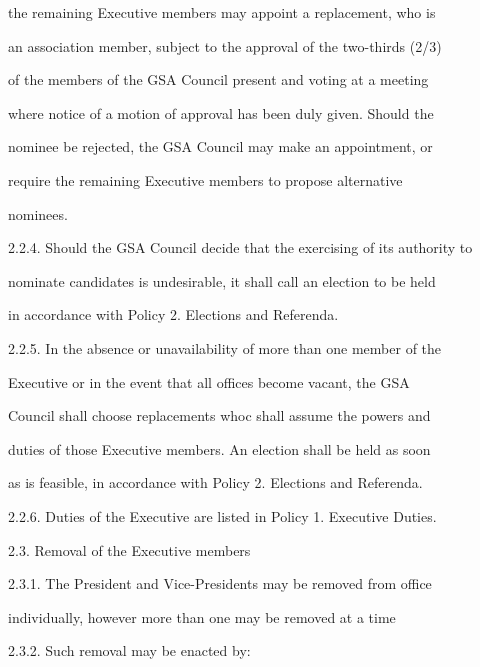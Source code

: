         the remaining Executive members may appoint a replacement, who is  

        an association member, subject to the approval of the two-thirds (2/3)  

        of the members of the GSA Council present and voting at a meeting  

        where notice of a motion of approval has been duly given. Should the  

        nominee be rejected, the GSA Council may make an appointment, or  

        require   the   remaining   Executive   members   to   propose   alternative  

        nominees.  



2.2.4.  Should the GSA Council decide that the exercising of its authority to  

        nominate candidates is undesirable, it shall call an election to  be held  

        in accordance with Policy 2. Elections and Referenda.  



2.2.5. In  the  absence  or  unavailability  of  more  than  one  member  of  the  

        Executive  or  in  the  event  that  all  offices  become  vacant,  the  GSA  

        Council shall choose replacements whoc shall assume the powers and  

        duties of those Executive members. An election shall be held as soon  

        as is feasible, in accordance with Policy 2. Elections and Referenda.  



2.2.6. Duties of the Executive are listed in Policy 1. Executive Duties.  



  



2.3.        Removal of the Executive members  



2.3.1. The   President   and  Vice-Presidents   may   be   removed   from   office  

        individually, however more than one may be removed at a time  



2.3.2.  Such removal may be enacted by:  



